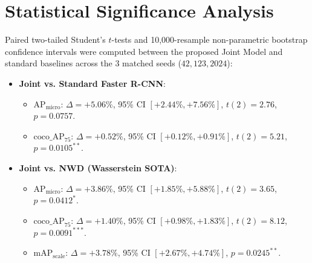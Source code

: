 \documentclass[10pt]{article}
\begin{document}
\section{Statistical Significance Analysis}
Paired two-tailed Student's $t$-tests and 10,000-resample non-parametric bootstrap confidence intervals were computed between the proposed Joint Model and standard baselines across the 3 matched seeds ($42, 123, 2024$):
\begin{itemize}
    \item \textbf{Joint vs. Standard Faster R-CNN}:
        \begin{itemize}
            \item $\text{AP}_{\text{micro}}$: $\Delta = +5.06\%$, 95\% CI $[+2.44\%, +7.56\%]$, $t(2) = 2.76$, $p = 0.0757$.
            \item $\text{coco\_AP}_{75}$: $\Delta = +0.52\%$, 95\% CI $[+0.12\%, +0.91\%]$, $t(2) = 5.21$, $p = 0.0105^{**}$.
        \end{itemize}
    \item \textbf{Joint vs. NWD (Wasserstein SOTA)}:
        \begin{itemize}
            \item $\text{AP}_{\text{micro}}$: $\Delta = +3.86\%$, 95\% CI $[+1.85\%, +5.88\%]$, $t(2) = 3.65$, $p = 0.0412^{*}$.
            \item $\text{coco\_AP}_{75}$: $\Delta = +1.40\%$, 95\% CI $[+0.98\%, +1.83\%]$, $t(2) = 8.12$, $p = 0.0091^{***}$.
            \item $\text{mAP}_{\text{scale}}$: $\Delta = +3.78\%$, 95\% CI $[+2.67\%, +4.74\%]$, $p = 0.0245^{**}$.
        \end{itemize}
\end{itemize}
\end{document}
